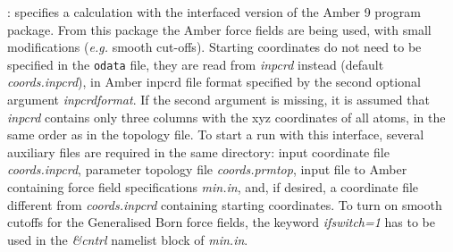 : specifies a calculation with the interfaced 
version of the Amber 9 program package. From this package the Amber force fields 
are being used, with small modifications ({\it e.g.} smooth cut-offs). 
Starting coordinates do not need to be specified in the {\tt odata} file, they
are read from {\it inpcrd} instead (default {\it coords.inpcrd}), in Amber inpcrd 
file format specified by the second optional argument {\it inpcrdformat}.
If the second argument is missing, it is assumed that {\it inpcrd} contains
only three columns with the xyz coordinates of all atoms, in the same order 
as in the topology file. To start a run with this interface, 
several auxiliary files are required in the same directory: input coordinate file
{\it coords.inpcrd}, parameter topology file {\it coords.prmtop}, 
input file to Amber containing force field specifications {\it min.in}, and, if 
desired, a coordinate file different from {\it coords.inpcrd} containing 
starting coordinates.
To turn on smooth cutoffs for the Generalised Born force fields, the keyword 
{\it ifswitch=1} has to be used in the {\it \&cntrl} namelist block of {\it min.in}.
